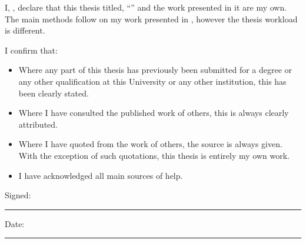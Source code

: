 
\begin{declaration}

\noindent I, \authorname, declare that this thesis titled, \enquote{\ttitle} and the work presented in it are my own. The main methods follow on my work presented in \citep{bulin_2016}, however the thesis workload is different.

I confirm that:

\begin{itemize} 
\item Where any part of this thesis has previously been submitted for a degree or any other qualification at this University or any other institution, this has been clearly stated.
\item Where I have consulted the published work of others, this is always clearly attributed.
\item Where I have quoted from the work of others, the source is always given. With the exception of such quotations, this thesis is entirely my own work.
\item I have acknowledged all main sources of help.
\end{itemize}
 
\noindent Signed:\\
\rule[0.5em]{25em}{0.5pt} %
 
\noindent Date:\\
\rule[0.5em]{25em}{0.5pt} %
\end{declaration}

\cleardoublepage